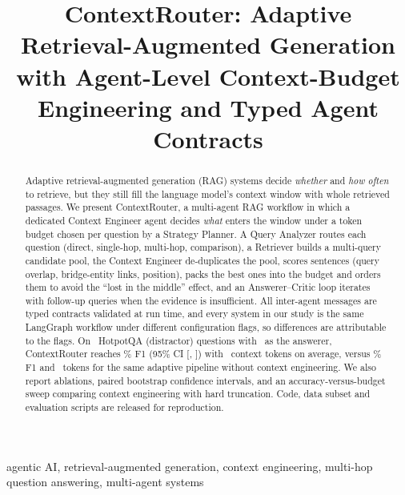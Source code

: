 \documentclass[conference]{IEEEtran}
\begin{document}
\title{ContextRouter: Adaptive Retrieval-Augmented Generation with Agent-Level Context-Budget Engineering and Typed Agent Contracts}

\author{
}

\maketitle

\begin{abstract}
Adaptive retrieval-augmented generation (RAG) systems decide \emph{whether} and \emph{how often} to retrieve, but
they still fill the language model's context window with whole retrieved passages. We present ContextRouter, a
multi-agent RAG workflow in which a dedicated Context Engineer agent decides \emph{what} enters the window under a
token budget chosen per question by a Strategy Planner. A Query Analyzer routes each question (direct, single-hop,
multi-hop, comparison), a Retriever builds a multi-query candidate pool, the Context Engineer de-duplicates the pool,
scores sentences (query overlap, bridge-entity links, position), packs the best ones into the budget and orders them
to avoid the ``lost in the middle'' effect, and an Answerer--Critic loop iterates with follow-up queries when the
evidence is insufficient. All inter-agent messages are typed contracts validated at run time, and every system in our
study is the same LangGraph workflow under different configuration flags, so differences are attributable to
the flags. On \nQ\ HotpotQA (distractor) questions with \mainModel\ as the answerer, ContextRouter reaches
\fOnecr\% F1 (95\% CI [\fLocr, \fHicr]) with \ctxTokcr\ context tokens on average, versus \fOnear\% F1 and \ctxTokar\
tokens for the same adaptive pipeline without context engineering. We also report ablations, paired bootstrap
confidence intervals, and an accuracy-versus-budget sweep comparing context engineering with hard truncation. Code,
data subset and evaluation scripts are released for reproduction.
\end{abstract}

\begin{IEEEkeywords}
agentic AI, retrieval-augmented generation, context engineering, multi-hop question answering, multi-agent systems
\end{IEEEkeywords}
\end{document}
